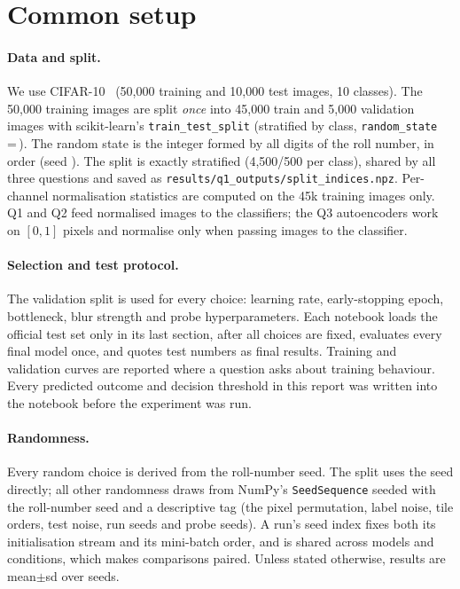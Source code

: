 \section{Common setup}
\label{sec:setup}

\paragraph{Data and split.} We use CIFAR-10~\cite{krizhevsky2009learning} (50,000 training and 10,000 test images, 10
classes). The 50,000 training images are split \emph{once} into 45,000 train and 5,000 validation images with
scikit-learn's \texttt{train\_test\_split} (stratified by class, \texttt{random\_state}\,=\,). The random
state is the integer formed by all digits of the roll number, in order (seed ). The split is exactly stratified (4,500/500 per class), shared by all three questions and saved as
\texttt{results/q1\_outputs/split\_indices.npz}. Per-channel normalisation statistics are computed on the 45k training
images only. Q1 and Q2 feed normalised images to the classifiers; the Q3 autoencoders work on $[0,1]$ pixels and
normalise only when passing images to the classifier.

\paragraph{Selection and test protocol.} The validation split is used for every choice: learning rate, early-stopping
epoch, bottleneck, blur strength and probe hyperparameters. Each notebook loads the official test set only in its last
section, after all choices are fixed, evaluates every final model once, and quotes test numbers as final results.
Training and validation curves are reported where a question asks about training behaviour. Every predicted outcome
and decision threshold in this report was written into the notebook before the experiment was run.

\paragraph{Randomness.} Every random choice is derived from the roll-number seed. The split uses the seed directly; all
other randomness draws from NumPy's \texttt{SeedSequence} seeded with the roll-number seed and a descriptive tag (\eg the
pixel permutation, label noise, tile orders, test noise, run seeds and probe seeds). A run's seed index fixes both its
initialisation stream and its mini-batch order, and is shared across models and conditions, which makes comparisons
paired. Unless stated otherwise, results are mean$\pm$sd over seeds.

